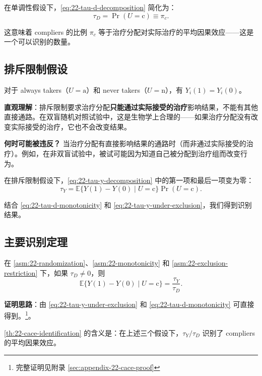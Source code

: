 在单调性假设下，\cref{eq:22-tau-d-decomposition} 简化为：
\[
\tau_D = \Pr(U = \text{c}) \equiv \pi_c.
\label{eq:22-tau-d-monotonicity}
\]

这意味着 compliers 的比例 $\pi_c$ 等于治疗分配对实际治疗的平均因果效应——这是一个可以识别的数量。

\subsection{排斥限制假设}

\begin{Assumption}[排斥限制]\label{asm:22-exclusion-restriction}
对于 always takers（$U = \text{a}$）和 never takers（$U = \text{n}$），有 $Y_i(1) = Y_i(0)$。
\end{Assumption}

\textbf{直观理解}：排斥限制要求治疗分配\textbf{只能通过实际接受的治疗}影响结果，不能有其他直接通路。在双盲随机对照试验中，这是生物学上合理的——如果治疗分配没有改变实际接受的治疗，它也不会改变结果。

\textbf{何时可能被违反？} 当治疗分配有直接影响结果的通路时（而非通过实际接受的治疗）。例如，在非双盲试验中，被试可能因为知道自己被分配到治疗组而改变行为。

在排斥限制假设下，\cref{eq:22-tau-y-decomposition} 中的第一项和最后一项变为零：
\[
\tau_Y = \mathbb{E}\{Y(1) - Y(0) \mid U = \text{c}\} \Pr(U = \text{c}).
\label{eq:22-tau-y-under-exclusion}
\]

结合 \cref{eq:22-tau-d-monotonicity} 和 \cref{eq:22-tau-y-under-exclusion}，我们得到识别结果。

\subsection{主要识别定理}

\begin{Theorem}\label{th:22-cace-identification}
在 \cref{asm:22-randomization}、\cref{asm:22-monotonicity} 和 \cref{asm:22-exclusion-restriction} 下，如果 $\tau_D \neq 0$，则
\[
\mathbb{E}\{Y(1) - Y(0) \mid U = \text{c}\} = \frac{\tau_Y}{\tau_D}.
\label{eq:22-cace-formula}
\]
\end{Theorem}

\textbf{证明思路}：由 \cref{eq:22-tau-y-under-exclusion} 和 \cref{eq:22-tau-d-monotonicity} 可直接得到。\footnote{完整证明见附录 \cref{sec:appendix-22-cace-proof}}。

\cref{th:22-cace-identification} 的含义是：在上述三个假设下，$\tau_Y / \tau_D$ 识别了 compliers 的平均因果效应。


